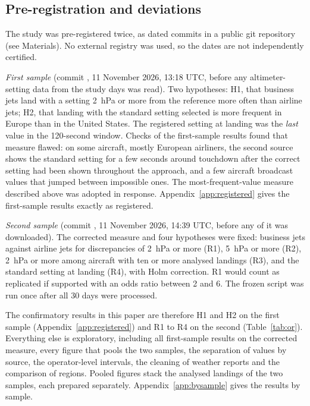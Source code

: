 \documentclass[11pt]{article}
\begin{document}
\subsection{Pre-registration and deviations}\label{sec:prereg}

The study was pre-registered twice, as dated commits in a public git repository (see Materials). No external registry was used, so the dates are not independently certified.

\emph{First sample} (commit , 11 November 2026, 13:18 UTC, before any altimeter-setting data from the study days was read). Two hypotheses: H1, that business jets land with a setting 2~hPa or more from the reference more often than airline jets; H2, that landing with the standard setting selected is more frequent in Europe than in the United States. The registered setting at landing was the \emph{last} value in the 120-second window. Checks of the first-sample results found that measure flawed: on some aircraft, mostly European airliners, the second source shows the standard setting for a few seconds around touchdown after the correct setting had been shown throughout the approach, and a few aircraft broadcast values that jumped between impossible ones. The most-frequent-value measure described above was adopted in response. Appendix~\ref{app:registered} gives the first-sample results exactly as registered.

\emph{Second sample} (commit , 11 November 2026, 14:39 UTC, before any of it was downloaded). The corrected measure and four hypotheses were fixed: business jets against airline jets for discrepancies of 2~hPa or more (R1), 5~hPa or more (R2), 2~hPa or more among aircraft with ten or more analysed landings (R3), and the standard setting at landing (R4), with Holm correction. R1 would count as replicated if supported with an odds ratio between 2 and 6. The frozen script was run once after all 30 days were processed.

The confirmatory results in this paper are therefore H1 and H2 on the first sample (Appendix~\ref{app:registered}) and R1 to R4 on the second (Table~\ref{tab:or}). Everything else is exploratory, including all first-sample results on the corrected measure, every figure that pools the two samples, the separation of values by source, the operator-level intervals, the cleaning of weather reports and the comparison of regions. Pooled figures stack the analysed landings of the two samples, each prepared separately. Appendix~\ref{app:bysample} gives the results by sample.
\end{document}
